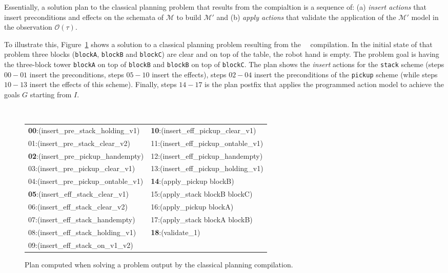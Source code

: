 \documentclass{article}
\begin{document}
Essentially, a solution plan to the classical planning problem that results from the compialtion is a sequence of: (a) \emph{insert actions} that insert preconditions and effects on the schemata of $\mathcal{M}$ to build $\mathcal{M'}$ and (b) \emph{apply actions} that validate the application of the $\mathcal{M'}$ model in the observation $\mathcal{O(\tau)}$.

To illustrate this, Figure~\ref{fig:plan-lplan} shows a solution to a classical planning problem resulting from the~\citeauthor{aineto2018learning}~\citeyear{aineto2018learning} compilation. In the initial state of that problem three  blocks ({\small\tt blockA}, {\small\tt blockB} and {\small\tt blockC}) are clear and on top of the table, the robot hand is empty. The problem goal is having the three-block tower {\tt blockA} on top of {\tt blockB} and {\tt blockB} on top of {\tt blockC}. The plan shows the {\em insert} actions for the {\tt\small stack} scheme (steps $00-01$ insert the preconditions, steps $05-10$ insert the effects), steps $02-04$ insert the preconditions of the {\tt\small pickup} scheme (while steps $10-13$ insert the effects of this scheme). Finally, steps $14-17$ is the plan postfix that applies the programmed action model to achieve the goals $G$ starting from $I$. 

\begin{figure}[hbt!]
	{\tiny\tt
\begin{tabular}{ll}
		{\bf 00}:(insert\_pre\_stack\_holding\_v1) & {\bf 10}:(insert\_eff\_pickup\_clear\_v1) \\
		01:(insert\_pre\_stack\_clear\_v2) & 11:(insert\_eff\_pickup\_ontable\_v1)\\
                {\bf 02}:(insert\_pre\_pickup\_handempty) & 12:(insert\_eff\_pickup\_handempty)\\
                03:(insert\_pre\_pickup\_clear\_v1) & 13:(insert\_eff\_pickup\_holding\_v1)\\
                04:(insert\_pre\_pickup\_ontable\_v1) & {\bf 14}:(apply\_pickup blockB)\\
                {\bf 05}:(insert\_eff\_stack\_clear\_v1) & 15:(apply\_stack blockB blockC)\\
                06:(insert\_eff\_stack\_clear\_v2) & 16:(apply\_pickup blockA)\\
                07:(insert\_eff\_stack\_handempty) & 17:(apply\_stack blockA blockB) \\
                08:(insert\_eff\_stack\_holding\_v1) &  {\bf 18}:(validate\_1)\\
                09:(insert\_eff\_stack\_on\_v1\_v2) &             		 
\end{tabular}
}
	\caption{\small Plan computed when solving a problem output by the classical planning compilation.}
	\label{fig:plan-lplan}
\end{figure}
\end{document}

